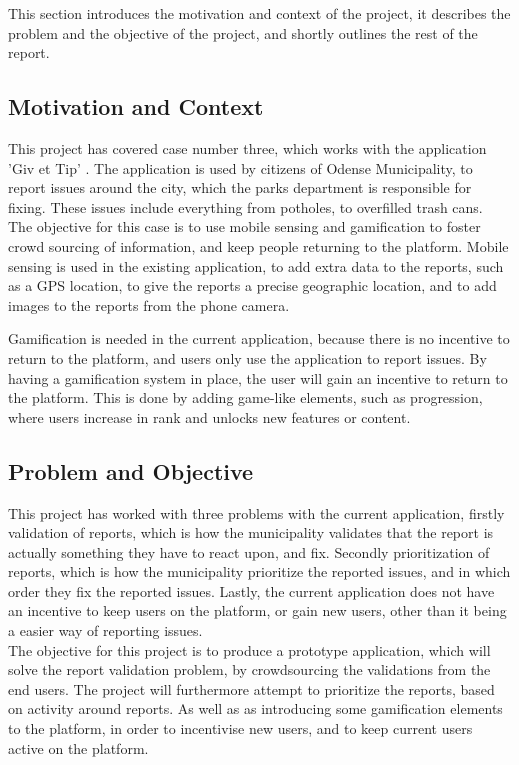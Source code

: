 
This section introduces the motivation and context of the project, it describes the problem and the objective of the project, and shortly outlines the rest of the report.


\subsection{Motivation and Context}
This project has covered case number three, which works with the application 'Giv et Tip' \cite{GivEtTip}. The application is used by citizens of Odense Municipality, to report issues around the city, which the parks department is responsible for fixing. These issues include everything from potholes, to overfilled trash cans.
~\\

The objective for this case is to use mobile sensing and gamification to foster crowd sourcing of information, and keep people returning to the platform.
Mobile sensing is used in the existing application, to add extra data to the reports, such as a GPS location, to give the reports a precise geographic location, and to add images to the reports from the phone camera.

Gamification is needed in the current application, because there is no incentive to return to the platform, and users only use the application to report issues. By having a gamification system in place, the user will gain an incentive to return to the platform. This is done by adding game-like elements, such as progression, where users increase in rank and unlocks new features or content.


\subsection{Problem and Objective}
This project has worked with three problems with the current application, firstly validation of reports, which is how the municipality validates that the report is actually something they have to react upon, and fix. 
Secondly prioritization of reports, which is how the municipality prioritize the reported issues, and in which order they fix the reported issues. 
Lastly, the current application does not have an incentive to keep users on the platform, or gain new users, other than it being a easier way of reporting issues.
~\\

The objective for this project is to produce a prototype application, which will solve the report validation problem, by crowdsourcing the validations from the end users. The project will furthermore attempt to prioritize the reports, based on activity around reports. As well as as introducing some gamification elements to the platform, in order to incentivise new users, and to keep current users active on the platform. 


